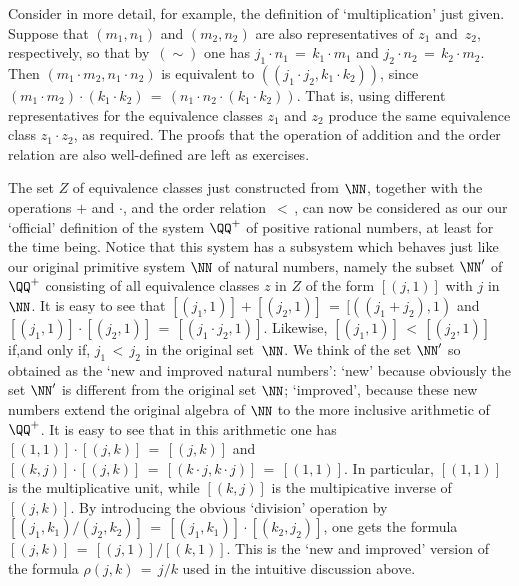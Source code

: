 {{    Consider in more detail, for example, the definition of `multiplication' just given.
    Suppose that $(m_{1}, n_{1})$ and $(m_{2}, n_{2})$ are also representatives of $z_{1}$ and~$z_{2}$, respectively,
    so that by~$(\sim)$ one has $j_{1}{\cdot}n_{1} \,=\, k_{1}{\cdot}m_{1}$ and $j_{2}{\cdot}n_{2} \,=\, k_{2}{\cdot}m_{2}$.
    Then $(m_{1}{\cdot}m_{2},n_{1}{\cdot}n_{2})$ is equivalent to $((j_{1}{\cdot}j_{2}, k_{1}{\cdot}k_{2}))$,
    since $(m_{1}{\cdot}m_{2}){\cdot}(k_{1}{\cdot}k_{2}) \,=\, (n_{1}{\cdot}n_{2}{\cdot}(k_{1}{\cdot}k_{2}))$.
    That is, using different representatives for the equivalence classes $z_{1}$ and $z_{2}$ produce the same equivalence class $z_{1}{\cdot}z_{2}$, as required.
    The proofs that the operation of addition and the order relation are also well-defined are left as exercises.


        The set $Z$ of equivalence classes just constructed from ${\NN}$, together with the operations $+$ and ${\cdot}$, and the order relation $\,<\,$,
    can now  be considered as our our `official' definition of the system ${\QQ}^{+}$ of positive rational numbers, at least for the time being.
    Notice that this system has a subsystem which behaves just like our original primitive system ${\NN}$ of natural numbers,
    namely the subset ${\NN}'$ of ${\QQ}^{+}$ consisting of all equivalence classes $z$ in $Z$ of the form $[(j,1)]$ with $j$ in ${\NN}$.
    It is easy to see that $[(j_{1},1)] + [(j_{2},1)] \,=\, [((j_{1}+j_{2}),1)$ and $[(j_{1},1)]{\cdot}[(j_{2},1)] \,=\, [(j_{1}{\cdot}j_{2},1)]$.
    Likewise, $[(j_{1},1)]\,<\,[(j_{2},1)]$ if,and only if, $j_{1}\,<\,j_{2}$ in the original set~${\NN}$.
    We think of the set ${\NN}'$ so obtained as the `new and improved natural numbers':
    `new' because obviously the set ${\NN}'$ is different from the original set ${\NN}$;
    `improved', because these new numbers extend the original algebra of ${\NN}$ to the more inclusive arithmetic of~${\QQ}^{+}$.
    It is easy to see that in this arithmetic one has $[(1,1)]{\cdot}[(j,k)] \,=\, [(j,k)]$
    and $[(k,j)]{\cdot}[(j,k)] \,=\, [(k{\cdot}j,k{\cdot}j)] \,=\, [(1,1)]$. In particular,
    $[(1,1)]$ is the multiplicative unit, while $[(k,j)]$ is the multipicative inverse of $[(j,k)]$.
    By introducing the obvious `division' operation by $[(j_{1},k_{1})/(j_{2},k_{2})] \,=\, [(j_{1},k_{1})]{\cdot}[(k_{2},j_{2})]$,
    one gets the formula $[(j,k)] \,=\, [(j,1)]/[(k,1)]$. This is the `new and improved'
    version of the formula ${\rho}(j,k) \,=\, j/k$ used in the intuitive discussion above.

}}
